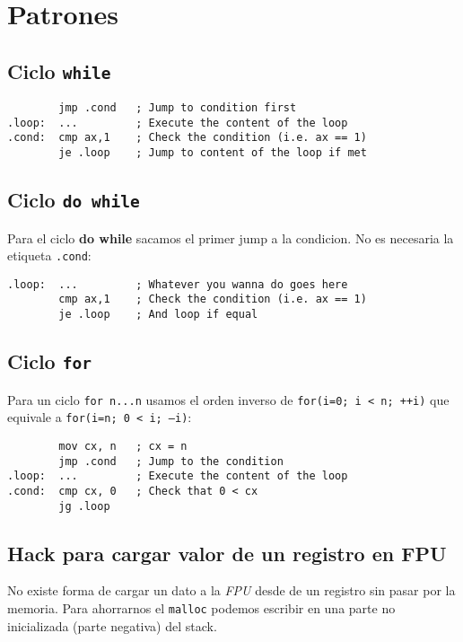 \documentclass{article}
\begin{document}
\section{Patrones}


\subsection{Ciclo \texttt{while}}

\begin{verbatim}
        jmp .cond   ; Jump to condition first
.loop:  ...         ; Execute the content of the loop
.cond:  cmp ax,1    ; Check the condition (i.e. ax == 1)
        je .loop    ; Jump to content of the loop if met
\end{verbatim}

\subsection{Ciclo \texttt{do while}}

Para el ciclo \textbf{do while} sacamos el primer jump a la condicion. No es
necesaria la etiqueta \texttt{.cond}:

\begin{verbatim}
.loop:  ...         ; Whatever you wanna do goes here
        cmp ax,1    ; Check the condition (i.e. ax == 1)
        je .loop    ; And loop if equal
\end{verbatim}

\subsection{Ciclo \texttt{for}}

Para un ciclo \texttt{for n...n} usamos el orden inverso de
\texttt{for(i=0; i < n; ++i)} que equivale a \texttt{for(i=n; 0 < i; --i)}:

\begin{verbatim}
        mov cx, n   ; cx = n
        jmp .cond   ; Jump to the condition
.loop:  ...         ; Execute the content of the loop
.cond:  cmp cx, 0   ; Check that 0 < cx
        jg .loop
\end{verbatim}

\subsection{Hack para cargar valor de un registro en FPU}

No existe forma de cargar un dato a la \textit{FPU} desde de un registro sin
pasar por la memoria. Para ahorrarnos el \texttt{malloc} podemos escribir en una
parte no inicializada (parte negativa) del stack.
\end{document}
